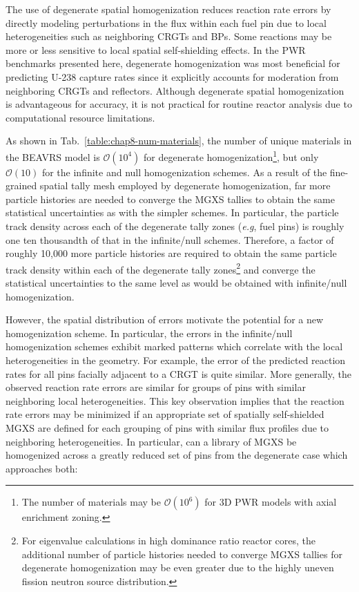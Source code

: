 The use of degenerate spatial homogenization reduces reaction rate errors by directly modeling perturbations in the flux within each fuel pin due to local heterogeneities such as neighboring \acp{CRGT} and \acp{BP}. Some reactions may be more or less sensitive to local spatial self-shielding effects. In the \ac{PWR} benchmarks presented here, degenerate homogenization was most beneficial for predicting U-238 capture rates since it explicitly accounts for moderation from neighboring \acp{CRGT} and reflectors. Although degenerate spatial homogenization is advantageous for accuracy, it is not practical for routine reactor analysis due to computational resource limitations.

As shown in Tab.~\ref{table:chap8-num-materials}, the number of unique materials in the \ac{BEAVRS} model is $\mathcal{O}(10^{4})$ for degenerate homogenization\footnote{The number of materials may be $\mathcal{O}(10^{6})$ for 3D \ac{PWR} models with axial enrichment zoning.}, but only $\mathcal{O}(10)$ for the infinite and null homogenization schemes. As a result of the fine-grained spatial tally mesh employed by degenerate homogenization, far more particle histories are needed to converge the \ac{MGXS} tallies to obtain the same statistical uncertainties as with the simpler schemes. In particular, the particle track density across each of the degenerate tally zones (\textit{e.g}, fuel pins) is roughly one ten thousandth of that in the infinite/null schemes. Therefore, a factor of roughly 10,000 more particle histories are required to obtain the same particle track density within each of the degenerate tally zones\footnote{For eigenvalue calculations in high dominance ratio reactor cores, the additional number of particle histories needed to converge \ac{MGXS} tallies for degenerate homogenization may be even greater due to the highly uneven fission neutron source distribution.} and converge the statistical uncertainties to the same level as would be obtained with infinite/null homogenization.

However, the  spatial distribution of errors motivate the potential for a new homogenization scheme. In particular, the errors in the infinite/null homogenization schemes exhibit marked patterns which correlate with the local heterogeneities in the geometry. For example, the error of the predicted reaction rates for all pins facially adjacent to a \ac{CRGT} is quite similar. More generally, the observed reaction rate errors are similar for groups of pins with similar neighboring local heterogeneities. This key observation implies that the reaction rate errors may be minimized if an appropriate set of spatially self-shielded \ac{MGXS} are defined for each grouping of pins with similar flux profiles due to neighboring heterogeneities. In particular, can a library of \ac{MGXS} be homogenized across a greatly reduced set of pins from the degenerate case which approaches both:

